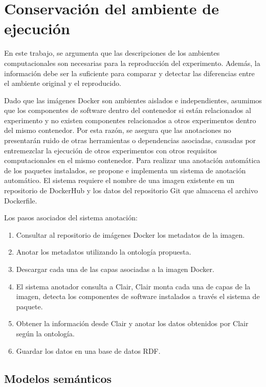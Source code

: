 \chapter{Conservación del ambiente de ejecución}

En este trabajo, se argumenta que las descripciones de los ambientes computacionales son necesarias para la reproducción del experimento. Además, la información debe ser la suficiente para comparar y detectar las diferencias entre el ambiente original y el reproducido.

Dado que las imágenes Docker son ambientes aislados e independientes, asumimos que los componentes de software dentro del contenedor si están relacionados al experimento y no existen componentes relacionados a otros experimentos dentro del mismo contenedor.
Por esta razón, se asegura que las anotaciones no presentarán ruido de otras herramientas o dependencias asociadas, causadas por entremezclar la ejecución de otros experimentos con otros requisitos computacionales en el mismo contenedor.
Para realizar una anotación automática de los paquetes instalados, se propone e implementa un sistema de anotación automático. El sistema requiere el nombre de una imagen existente en un repositorio de DockerHub y los datos del repositorio Git que almacena el archivo Dockerfile. 

Los pasos asociados del sistema anotación:
\begin{enumerate}
	\item Consultar al repositorio de imágenes Docker los metadatos de la imagen. 
	\item Anotar los metadatos utilizando la ontología propuesta.
	\item Descargar cada una de las capas asociadas a la imagen Docker.
	\item El sistema anotador consulta a Clair, Clair monta cada una de capas de la imagen, detecta los componentes de software instalados a través el sistema de paquete.
	\item Obtener la información desde Clair y anotar los datos obtenidos por Clair según la ontología.
	\item Guardar los datos en una base de datos RDF.
\end{enumerate} 

\section{Modelos semánticos}\label{s4.1}
     
